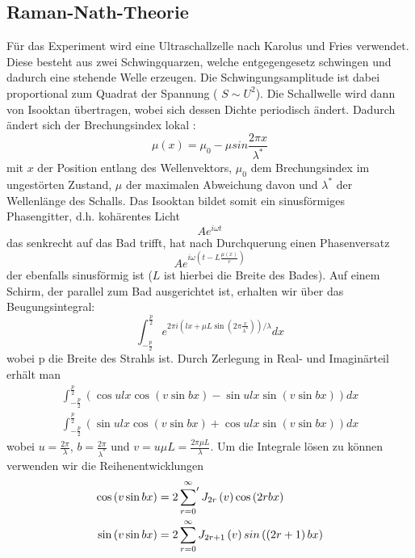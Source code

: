 \subsection{Raman-Nath-Theorie}
Für das Experiment wird eine Ultraschallzelle nach Karolus und Fries \cite{Karolus} verwendet. Diese besteht aus zwei Schwingquarzen, welche entgegengesetz schwingen und dadurch eine stehende Welle erzeugen. Die Schwingungsamplitude ist dabei proportional zum Quadrat der Spannung ( $S \sim U^2$). Die Schallwelle wird dann von Isooktan übertragen, wobei sich dessen Dichte periodisch ändert. Dadurch ändert sich der Brechungsindex lokal \cite{Raman}: 
\begin{equation}
 \mu \left( x \right) = \mu_0 - \mu sin \frac{2 \pi x}{ \lambda^*}
\end{equation}
mit $x$ der Position entlang des Wellenvektors, $\mu_0$ dem Brechungsindex im ungestörten Zustand, $\mu$ der maximalen Abweichung davon und $\lambda^*$ der Wellenlänge des Schalls. Das Isooktan bildet somit ein sinusförmiges Phasengitter, d.h. kohärentes Licht
\begin{equation}
 A e^{i \omega t}
\end{equation}
das senkrecht auf das Bad trifft, hat nach Durchquerung einen Phasenversatz
\begin{equation}
 A e^{i \omega \left( t - L \frac{\mu \left( x \right)}{c} \right)}
\end{equation}
der ebenfalls sinusförmig ist ($L$ ist hierbei die Breite des Bades). 
Auf einem Schirm, der parallel zum Bad ausgerichtet ist, erhalten wir über das Beugungsintegral:
\begin{equation}
 \int_{-\frac{p}{2}}^{\frac{p}{2}} e^{2 \pi i \left( l x + \mu L \sin \left( 2 \pi \frac{x}{\lambda^*} \right) \right) / \lambda } dx
\end{equation}
wobei p die Breite des Strahls ist. Durch Zerlegung in Real- und Imaginärteil erhält man
\begin{align}
 \int_{-\frac{p}{2}}^{\frac{p}{2}} \left( \cos ulx \cos \left( v \sin bx \right) - \sin ulx \sin \left( v \sin bx \right) \right) dx \\
\int_{-\frac{p}{2}}^{\frac{p}{2}} \left( \sin ulx \cos \left( v \sin bx \right) + \cos ulx \sin \left( v \sin bx \right) \right) dx
\end{align}
wobei $u = \frac{2 \pi}{\lambda}$, $b = \frac{2 \pi}{\lambda^*}$ und $v= u \mu L = \frac{2 \pi \mu L}{\lambda}$.
Um die Integrale lösen zu können verwenden wir die Reihenentwicklungen
\begin{align}
 \cos \left( v \sin bx \right) & =  2 \sideset{}{'} \sum_{r=0}^{\infty} J_{2r} \left( v \right) \cos \left( 2rbx \right) \\
 \sin \left( v \sin bx \right) & =  2 \sum_{r=0}^{\infty} J_{2r+1} \left( v \right) sin \left( \left( 2r+1 \right) bx \right)
\end{align}
